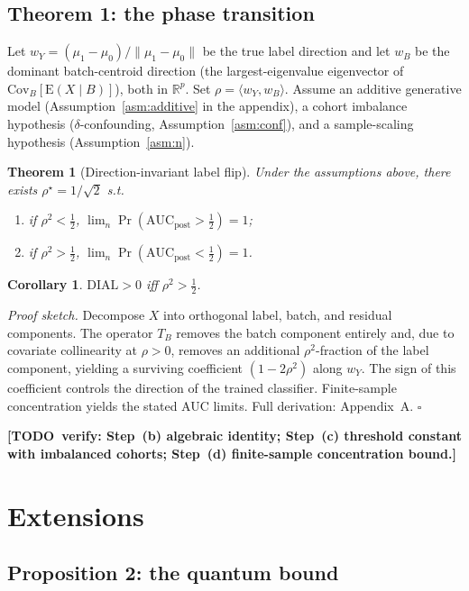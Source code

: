 \documentclass[letterpaper,11pt]{article}
\newtheorem{theorem}{Theorem}
\newtheorem{corollary}{Corollary}
\newcommand{\TODO}[1]{\textbf{[TODO~verify: #1]}}
\newcommand{\R}{\mathbb{R}}
\begin{document}
\subsection{Theorem 1: the phase transition}
\label{sec:thm1}

Let
$w_Y = (\mu_1-\mu_0)/\|\mu_1-\mu_0\|$ be the true label direction
and let $w_B$ be the dominant batch-centroid direction
(the largest-eigenvalue eigenvector of
$\mathrm{Cov}_{\!B}[\mathrm{E}(X\mid B)]$), both in $\R^{p}$.
Set $\rho = \langle w_Y, w_B\rangle$.  Assume an additive generative
model (Assumption~\ref{asm:additive} in the appendix), a cohort
imbalance hypothesis ($\delta$-confounding,
Assumption~\ref{asm:conf}), and a sample-scaling hypothesis
(Assumption~\ref{asm:n}).

\begin{theorem}[Direction-invariant label flip]
\label{thm:flip}
Under the assumptions above, there exists $\rho^\star=1/\sqrt{2}$ s.t.
\begin{enumerate}[label=(\roman*)]
\item if $\rho^2 < \tfrac12$, $\lim_n \Pr(\mathrm{AUC}_{\text{post}}>\tfrac12)=1$;
\item if $\rho^2 > \tfrac12$, $\lim_n \Pr(\mathrm{AUC}_{\text{post}}<\tfrac12)=1$.
\end{enumerate}
\end{theorem}

\begin{corollary}
\label{cor:dial}
$\mathrm{DIAL}>0$ iff $\rho^2>\tfrac12$.
\end{corollary}

\emph{Proof sketch.} Decompose $X$ into orthogonal label, batch, and
residual components.  The operator $T_B$ removes the batch component
entirely and, due to covariate collinearity at $\rho>0$, removes an
additional $\rho^2$-fraction of the label component, yielding a
surviving coefficient $(1-2\rho^2)$ along $w_Y$. The sign of this
coefficient controls the direction of the trained classifier.
Finite-sample concentration yields the stated AUC limits. Full
derivation: Appendix~A. \hfill$\square$

\TODO{Step~(b) algebraic identity; Step~(c) threshold constant with
imbalanced cohorts; Step~(d) finite-sample concentration bound.}

\section{Extensions}
\subsection{Proposition 2: the quantum bound}
\label{sec:quantum}
\end{document}
